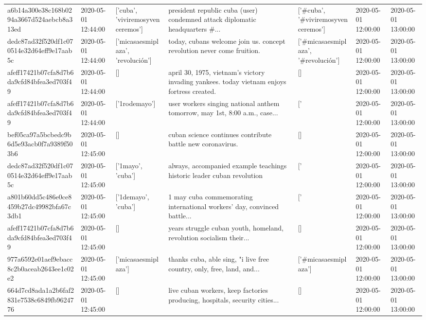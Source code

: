 \begin{tabular}{lllllll}
a6b14a300e38c168b0294a3667d524aebcb8a313ed & 2020-05-01 12:44:00 & ['cuba', 'viviremosyvenceremos'] & president republic cuba (user) condemned attack diplomatic headquarters \#... & ['#cuba', '#viviremosyvenceremos'] & 2020-05-01 12:00:00 & 2020-05-01 13:00:00 \\
dedc87ad32f520df1c070514e32d64eff9e17aab5c & 2020-05-01 12:44:00 & ['micasaesmiplaza', 'revolución'] & today, cubans welcome join us. concept revolution never come fruition. & ['#micasaesmiplaza', '#revolución'] & 2020-05-01 12:00:00 & 2020-05-01 13:00:00 \\
afeff17421b07cfa8d7b6da9cfd84bfea3ed703f49 & 2020-05-01 12:44:00 & [] & april 30, 1975, vietnam's victory invading yankees. today vietnam enjoys fortress created. & [] & 2020-05-01 12:00:00 & 2020-05-01 13:00:00 \\
afeff17421b07cfa8d7b6da9cfd84bfea3ed703f49 & 2020-05-01 12:44:00 & ['1rodemayo'] & user workers singing national anthem tomorrow, may 1st, 8:00 a.m., case... & ['#1rodemayo'] & 2020-05-01 12:00:00 & 2020-05-01 13:00:00 \\
bef05ca97a5bcbedc9b6d5e93acb0f7a9389f503b6 & 2020-05-01 12:45:00 & [] & cuban science continues contribute battle new coronavirus. & [] & 2020-05-01 12:00:00 & 2020-05-01 13:00:00 \\
dedc87ad32f520df1c070514e32d64eff9e17aab5c & 2020-05-01 12:45:00 & ['1mayo', 'cuba'] & always, accompanied example teachings historic leader cuban revolution & ['#1mayo', '#cuba'] & 2020-05-01 12:00:00 & 2020-05-01 13:00:00 \\
a801b60dd5c486e0ce8459b27dc49982bfa67c3db1 & 2020-05-01 12:45:00 & ['1demayo', 'cuba'] & 1 may cuba commemorating international workers' day, convinced battle... & ['#1demayo', '#cuba'] & 2020-05-01 12:00:00 & 2020-05-01 13:00:00 \\
afeff17421b07cfa8d7b6da9cfd84bfea3ed703f49 & 2020-05-01 12:45:00 & [] & years struggle cuban youth, homeland, revolution socialism their... & [] & 2020-05-01 12:00:00 & 2020-05-01 13:00:00 \\
977a6592e01aef9ebacc8c2b0aceab2643ee1c02e2 & 2020-05-01 12:45:00 & ['micasaesmiplaza'] & thanks cuba, able sing, "i live free country, only, free, land, and... & ['#micasaesmiplaza'] & 2020-05-01 12:00:00 & 2020-05-01 13:00:00 \\
664d7cd8ada1a2b6faf2831e7538c6849fb9624776 & 2020-05-01 12:45:00 & [] & live cuban workers, keep factories producing, hospitals, security cities... & [] & 2020-05-01 12:00:00 & 2020-05-01 13:00:00 \\

\end{tabular}
